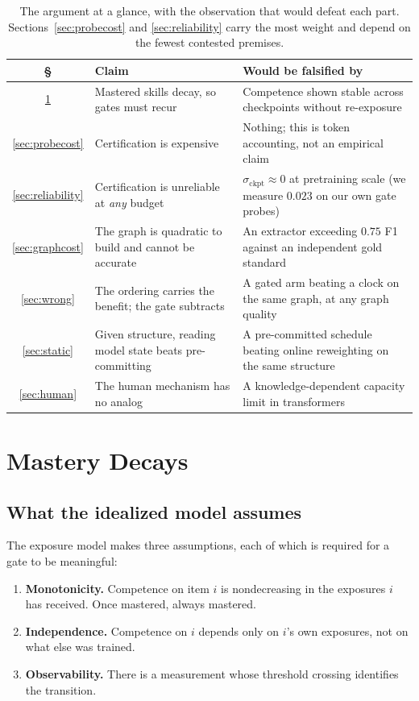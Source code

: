 \documentclass[11pt]{article}
\theoremstyle{plain}
\theoremstyle{definition}
\theoremstyle{remark}
\begin{document}
\begin{table}[ht]
\centering
\small
\begin{tabularx}{\textwidth}{@{}c L L@{}}
\toprule
\S & Claim & Would be falsified by \\
\midrule
\ref{sec:decay} & Mastered skills decay, so gates must recur &
  Competence shown stable across checkpoints without re-exposure \\
\ref{sec:probecost} & Certification is expensive &
  Nothing; this is token accounting, not an empirical claim \\
\ref{sec:reliability} & Certification is unreliable at \emph{any} budget &
  $\sigma_{\text{ckpt}} \approx 0$ at pretraining scale (we measure $0.023$ on
  our own gate probes) \\
\ref{sec:graphcost} & The graph is quadratic to build and cannot be accurate &
  An extractor exceeding $0.75$ F1 against an independent gold standard \\
\ref{sec:wrong} & The ordering carries the benefit; the gate subtracts &
  A gated arm beating a clock on the same graph, at any graph quality \\
\ref{sec:static} & Given structure, reading model state beats pre-committing &
  A pre-committed schedule beating online reweighting on the same structure \\
\ref{sec:human} & The human mechanism has no analog &
  A knowledge-dependent capacity limit in transformers \\
\bottomrule
\end{tabularx}
\caption{The argument at a glance, with the observation that would defeat each
part. Sections~\ref{sec:probecost} and \ref{sec:reliability} carry the most
weight and depend on the fewest contested premises.}
\label{tab:roadmap}
\end{table}

\section{Mastery Decays}
\label{sec:decay}

\subsection{What the idealized model assumes}

The exposure model makes three assumptions, each of which is required for a gate
to be meaningful:

\begin{enumerate}[leftmargin=1.6em,itemsep=1pt]
  \item \textbf{Monotonicity.} Competence on item $i$ is nondecreasing in the
        exposures $i$ has received. Once mastered, always mastered.
  \item \textbf{Independence.} Competence on $i$ depends only on $i$'s own
        exposures, not on what else was trained.
  \item \textbf{Observability.} There is a measurement whose threshold crossing
        identifies the transition.
\end{enumerate}
\end{document}

